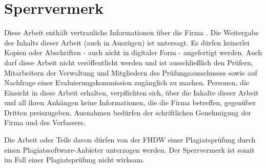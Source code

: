 \section*{Sperrvermerk}

Diese Arbeit enthält vertrauliche Informationen über die Firma \koorperationsunternehmen. Die Weitergabe des Inhalts dieser Arbeit (auch in Auszügen) ist untersagt. Es dürfen keinerlei Kopien oder Abschriften - auch nicht in digitaler Form - angefertigt werden. Auch darf diese Arbeit nicht veröffentlicht werden und ist ausschließlich den Prüfern, Mitarbeitern der Verwaltung und Mitgliedern des Prüfungsausschusses sowie auf Nachfrage einer Evaluierungskommission zugänglich zu machen. Personen, die Einsicht in diese Arbeit erhalten, verpflichten sich, über die Inhalte dieser Arbeit und all ihren Anhängen keine Informationen, die die Firma \koorperationsunternehmen{} betreffen, gegenüber Dritten preiszugeben. Ausnahmen bedürfen der schriftlichen Genehmigung der Firma \koorperationsunternehmen{} und des Verfassers.


Die Arbeit oder Teile davon dürfen von der FHDW einer Plagiatsprüfung durch einen Plagiatssoftware-Anbieter unterzogen werden. Der Sperrvermerk ist somit im Fall einer Plagiatsprüfung nicht wirksam.
\newpage
\fancyhead[R]{\leftmark}